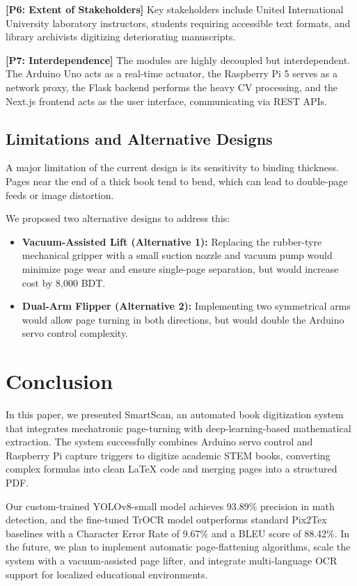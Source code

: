 \documentclass[conference]{IEEEtran}
\begin{document}
\noindent \textbf{[P6: Extent of Stakeholders]} Key stakeholders include United International University laboratory instructors, students requiring accessible text formats, and library archivists digitizing deteriorating manuscripts.

\noindent \textbf{[P7: Interdependence]} The modules are highly decoupled but interdependent. The Arduino Uno acts as a real-time actuator, the Raspberry Pi 5 serves as a network proxy, the Flask backend performs the heavy CV processing, and the Next.js frontend acts as the user interface, communicating via REST APIs.

\subsection{Limitations and Alternative Designs}

A major limitation of the current design is its sensitivity to binding thickness. Pages near the end of a thick book tend to bend, which can lead to double-page feeds or image distortion. 

We proposed two alternative designs to address this:
\begin{itemize}
\item \textbf{Vacuum-Assisted Lift (Alternative 1):} Replacing the rubber-tyre mechanical gripper with a small suction nozzle and vacuum pump would minimize page wear and ensure single-page separation, but would increase cost by 8,000 BDT.
\item \textbf{Dual-Arm Flipper (Alternative 2):} Implementing two symmetrical arms would allow page turning in both directions, but would double the Arduino servo control complexity.
\end{itemize}

\section{Conclusion}
\label{sec:conclusion}

In this paper, we presented SmartScan, an automated book digitization system that integrates mechatronic page-turning with deep-learning-based mathematical extraction. The system successfully combines Arduino servo control and Raspberry Pi capture triggers to digitize academic STEM books, converting complex formulas into clean LaTeX code and merging pages into a structured PDF.

Our custom-trained YOLOv8-small model achieves 93.89\% precision in math detection, and the fine-tuned TrOCR model outperforms standard Pix2Tex baselines with a Character Error Rate of 9.67\% and a BLEU score of 88.42\%. In the future, we plan to implement automatic page-flattening algorithms, scale the system with a vacuum-assisted page lifter, and integrate multi-language OCR support for localized educational environments.
\end{document}
